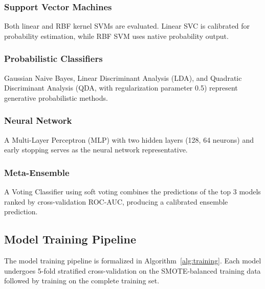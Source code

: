 \documentclass[conference,10pt]{IEEEtran}
\begin{document}
\subsubsection{Support Vector Machines}
Both linear and RBF kernel SVMs are evaluated. Linear SVC is calibrated for probability estimation, while RBF SVM uses native probability output.

\subsubsection{Probabilistic Classifiers}
Gaussian Naive Bayes, Linear Discriminant Analysis (LDA), and Quadratic Discriminant Analysis (QDA, with regularization parameter 0.5) represent generative probabilistic methods.

\subsubsection{Neural Network}
A Multi-Layer Perceptron (MLP) with two hidden layers (128, 64 neurons) and early stopping serves as the neural network representative.

\subsubsection{Meta-Ensemble}
A Voting Classifier using soft voting combines the predictions of the top 3 models ranked by cross-validation ROC-AUC, producing a calibrated ensemble prediction.

\subsection{Model Training Pipeline}
\label{subsec:training}

The model training pipeline is formalized in Algorithm~\ref{alg:training}. Each model undergoes 5-fold stratified cross-validation on the SMOTE-balanced training data followed by training on the complete training set.
\end{document}

